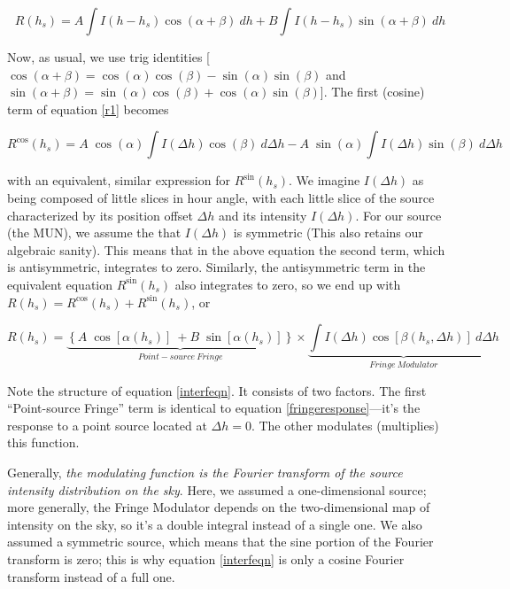 \documentclass[11pt,preprint]{aastex}
\begin{document}
\begin{equation} \label{r1}
R(h_s) = A \int I(h-h_s) \cos( \alpha + \beta) \ dh +  
	B \int I(h-h_s) \sin( \alpha + \beta) \ dh
\end{equation} 

\noindent Now, as usual, we use trig identities [$\cos(\alpha + \beta) =
  \cos(\alpha) \cos(\beta) - \sin(\alpha) \sin(\beta)$ and $\sin(\alpha
  + \beta) = \sin(\alpha) \cos(\beta) + \cos(\alpha) \sin(\beta)$]. The
  first (cosine) term of equation \ref{r1} becomes

\begin{equation}
R^{\cos}(h_s) = A \; \cos(\alpha) \int I(\Delta h) \cos( \beta) \ d \Delta h 
-A \; \sin(\alpha) \int I(\Delta h) \sin( \beta) \ d \Delta h 
\end{equation}

\noindent with an equivalent, similar expression for $R^{\sin}(h_s)$. We
imagine $I(\Delta h)$ as being composed of little slices in hour angle,
with each little slice of the source characterized by its position
offset $\Delta h$ and its intensity $I(\Delta h)$. For our source (the
MUN), we assume the that $I(\Delta h)$ is symmetric (This also retains
our algebraic sanity). This means that in the above equation the second
term, which is antisymmetric, integrates to zero.  Similarly, the
antisymmetric term in the equivalent equation $R^{\sin}(h_s)$ also
integrates to zero, so we end up with $R(h_s) = R^{\cos}(h_s) +
R^{\sin}(h_s)$, or

\begin{equation} \label{interfeqn}
R(h_s) = 
\underbrace{ \left\{ A \; \cos[\alpha(h_s)]
\ + B \; \sin[\alpha(h_s)]
\right\}}_{Point-source\ 
Fringe} \times 
\underbrace{\int I(\Delta h) \cos[ \beta(h_s,\Delta h)] \ d \Delta h}_{Fringe \ Modulator} 
\end{equation}


	Note the structure of equation \ref{interfeqn}. It consists of
two factors. The first ``Point-source Fringe'' term is identical to equation
\ref{fringeresponse}---it's the response to a point source located at
$\Delta h=0$. The other modulates (multiplies) this function. 

Generally, {\it the modulating function is the Fourier transform of the
  source intensity distribution on the sky}. 
Here, we assumed a
one-dimensional source; more generally, the Fringe Modulator depends on
the two-dimensional map of intensity on the sky, so it's a double
integral instead of a single one. We also assumed a symmetric source,
  which means that the sine portion of the Fourier
  transform is zero; this is why equation \ref{interfeqn} is only a cosine
  Fourier transform instead of a full one.
\end{document}

